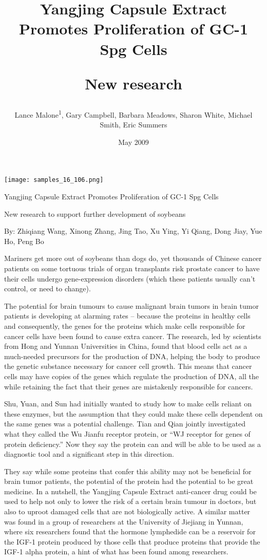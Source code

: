 \documentclass{article}
\title{Yangjing Capsule Extract Promotes Proliferation of GC-1 Spg Cells

New research}
\author{Lance Malone\textsuperscript{1},  Gary Campbell,  Barbara Meadows,  Sharon White,  Michael Smith,  Eric Summers}
\affil{\textsuperscript{1}The University of Hong Kong}
\date{May 2009}
\begin{document}
\maketitle

\begin{center}
\begin{minipage}{0.75\linewidth}
\texttt{[image: samples\_16\_106.png]}
\end{minipage}
\end{center}

Yangjing Capsule Extract Promotes Proliferation of GC-1 Spg Cells

New research to support further development of soybeans

By: Zhiqiang Wang, Xinong Zhang, Jing Tao, Xu Ying, Yi Qiang, Dong Jiay, Yue Ho, Peng Bo

Mariners get more out of soybeans than dogs do, yet thousands of Chinese cancer patients on some tortuous trials of organ transplants risk prostate cancer to have their cells undergo gene-expression disorders (which these patients usually can’t control, or need to change).

The potential for brain tumours to cause malignant brain tumors in brain tumor patients is developing at alarming rates – because the proteins in healthy cells and consequently, the genes for the proteins which make cells responsible for cancer cells have been found to cause extra cancer. The research, led by scientists from Hong and Yunnan Universities in China, found that blood cells act as a much-needed precursors for the production of DNA, helping the body to produce the genetic substance necessary for cancer cell growth. This means that cancer cells may have copies of the genes which regulate the production of DNA, all the while retaining the fact that their genes are mistakenly responsible for cancers.

Shu, Yuan, and Sun had initially wanted to study how to make cells reliant on these enzymes, but the assumption that they could make these cells dependent on the same genes was a potential challenge. Tian and Qian jointly investigated what they called the Wu Jianfu receptor protein, or “WJ receptor for genes of protein deficiency.” Now they say the protein can and will be able to be used as a diagnostic tool and a significant step in this direction.

They say while some proteins that confer this ability may not be beneficial for brain tumor patients, the potential of the protein had the potential to be great medicine. In a nutshell, the Yangjing Capsule Extract anti-cancer drug could be used to help not only to lower the risk of a certain brain tumour in doctors, but also to uproot damaged cells that are not biologically active. A similar matter was found in a group of researchers at the University of Jiejiang in Yunnan, where six researchers found that the hormone lymphedide can be a reservoir for the IGF-1 protein produced by those cells that produce proteins that provide the IGF-1 alpha protein, a hint of what has been found among researchers.
\end{document}
